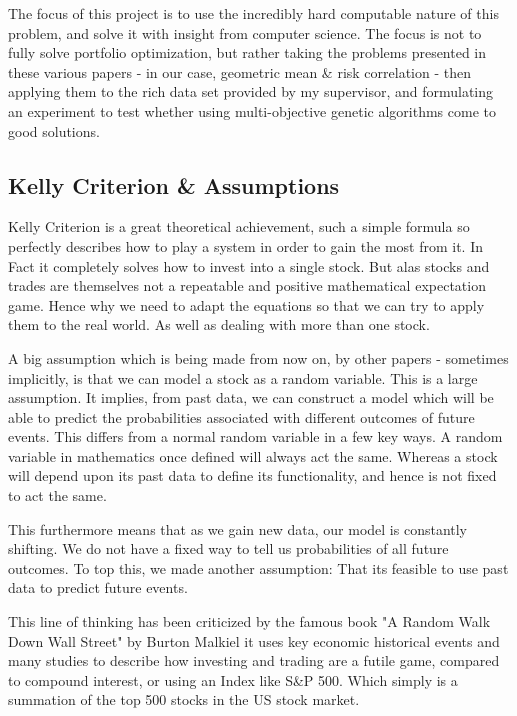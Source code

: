 \documentclass[12pt]{article}
\begin{document}
    The focus of this project is to use the incredibly hard computable nature
    of this problem, and solve it with insight from computer science. The focus
    is not to fully solve portfolio optimization, but rather taking the problems
    presented in these various papers - in our case, geometric mean \& risk
    correlation - then applying them to the rich data set provided
    by my supervisor, and formulating an experiment to test whether using
    multi-objective genetic algorithms come to good solutions.

\subsection{Kelly Criterion \& Assumptions}

    Kelly Criterion \cite{Kelly} is a great theoretical achievement, such a simple formula so
    perfectly describes how to play a system in order to gain the most from it. In Fact
    it completely solves how to invest into a single stock. But alas
    stocks and trades are themselves not a repeatable and positive mathematical expectation
    game. Hence why we need to adapt the equations so that we can try to apply them to the
    real world. As well as dealing with more than one stock.

    A big assumption which is being made from now on, by other papers - sometimes implicitly,
    is that we can model a stock as a random variable. This is a large assumption. It
    implies, from past data, we can construct a model which will be able
    to predict the probabilities associated with different outcomes of future events.
    This differs from a normal random variable in a few key ways. A random variable in
    mathematics once defined will always act the same. Whereas a stock will
    depend upon its past data to define its functionality, and hence is not fixed to act
    the same.

    This furthermore means that as we gain new data, our model is constantly shifting.
    We do not have a fixed way to tell us probabilities of all future outcomes.
    To top this, we made another assumption: That its feasible to use past data to predict
    future events.

    This line of thinking has been criticized by the famous book "A Random Walk Down
    Wall Street" by Burton Malkiel \cite{BurtonMalkiel} it uses
    key economic historical events and many studies to describe how investing and trading are
    a futile game, compared to compound interest, or using an Index like S\&P 500. Which
    simply is a summation of the top 500 stocks in the US stock market.
\end{document}
